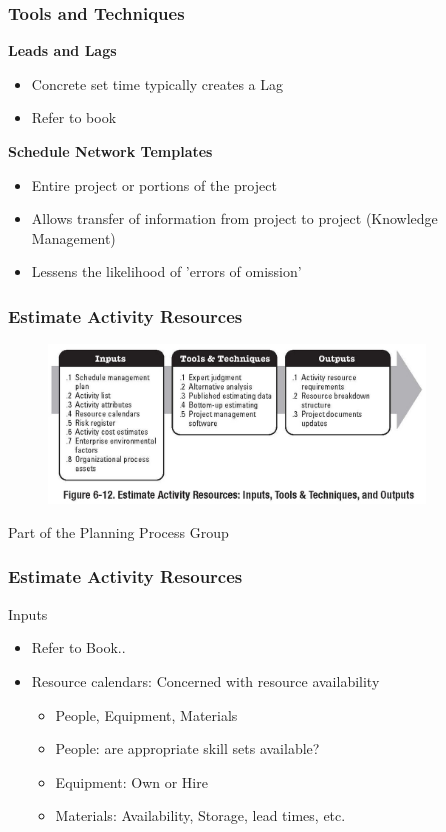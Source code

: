 \begin{frame}
\frametitle{Tools and Techniques}
\textbf{Leads and Lags}
\begin{itemize}
	\item Concrete set time typically creates a Lag
	\item Refer to book 
\end{itemize}
\textbf{Schedule Network Templates}
\begin{itemize}
	\item Entire project or portions of the project
	\item Allows transfer of information from project to project (Knowledge Management)
	\item Lessens the likelihood of 'errors of omission'
\end{itemize}
\end{frame}




\begin{frame}
\frametitle{Estimate Activity Resources}
\begin{figure}
	\centering
		\includegraphics[width = 10cm]{images/Fig6-12.jpg}
	\label{fig:6-12}
\end{figure}
Part of the Planning Process Group
\end{frame}




\begin{frame}
\frametitle{Estimate Activity Resources}
Inputs
\begin{itemize}
	\item Refer to Book..
	\item Resource calendars: Concerned with resource availability
\begin{itemize}
	\item People, Equipment, Materials
	\item People: are appropriate skill sets available?
	\item Equipment: Own or Hire
	\item Materials: Availability, Storage, lead times, etc.
\end{itemize}
\end{itemize}
\end{frame}




